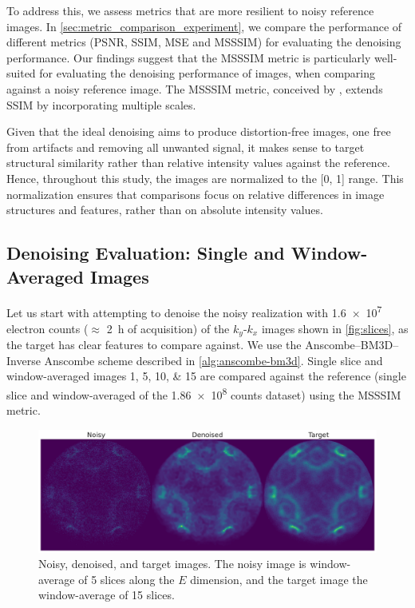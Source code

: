 To address this, we assess metrics that are more resilient to noisy reference images. In \cref{sec:metric_comparison_experiment}, we compare the performance of different metrics (\gls{PSNR}, \gls{SSIM}, \gls{MSE} and \gls{MSSSIM}) for evaluating the denoising performance. Our findings suggest that the \gls{MSSSIM} metric is particularly well-suited for evaluating the denoising performance of images, when comparing against a noisy reference image. The \gls{MSSSIM} metric, conceived by \citeauthor{wangMultiscaleStructuralSimilarity2003} \cite{wangMultiscaleStructuralSimilarity2003}, extends SSIM by incorporating multiple scales. 

Given that the ideal denoising aims to produce distortion-free images, one free from artifacts and removing all unwanted signal, it makes sense to target structural similarity rather than relative intensity values against the reference. Hence, throughout this study, the images are normalized to the [\num{0}, \num{1}] range. This normalization ensures that comparisons focus on relative differences in image structures and features, rather than on absolute intensity values.

\subsection{Denoising Evaluation: Single and Window-Averaged Images}
Let us start with attempting to denoise the noisy realization with \num{1.6e7} electron counts ($\approx$ \qty{2}{h} of acquisition) of the $k_y$-$k_x$ images shown in \cref{fig:slices}, as the target has clear features to compare against. We use the Anscombe--\gls{BM3D}--Inverse Anscombe scheme described in \cref{alg:anscombe-bm3d}. Single slice and window-averaged images \numlist{1;5;10;15} are compared against the reference (single slice and window-averaged of the \num{1.86e8} counts dataset) using the \gls{MSSSIM} metric.

\begin{figure}
    \centering
    \includegraphics[width=1\linewidth]{images/noisy_denoised_ref_16M_avg_bm3d.pdf}
    \caption{Noisy, denoised, and target images. The noisy image is window-average of 5 slices along the $E$ dimension, and the target image the window-average of 15 slices.}
    \label{fig:noisy-denoised-ref-16M-avg-bm3d}
\end{figure}

